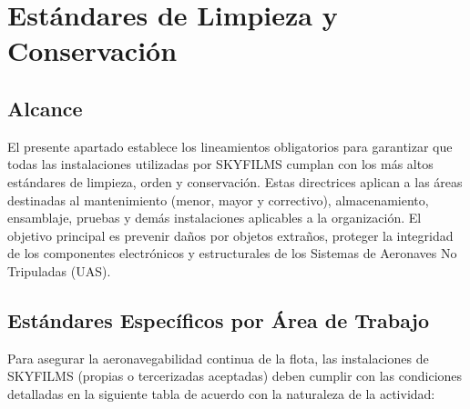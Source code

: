 \section{Estándares de Limpieza y Conservación}

\subsection{Alcance}
El presente apartado establece los lineamientos obligatorios para garantizar que todas las instalaciones utilizadas por SKYFILMS cumplan con los más altos estándares de limpieza, orden y conservación. Estas directrices aplican a las áreas destinadas al mantenimiento (menor, mayor y correctivo), almacenamiento, ensamblaje, pruebas y demás instalaciones aplicables a la organización. El objetivo principal es prevenir daños por objetos extraños, proteger la integridad de los componentes electrónicos y estructurales de los Sistemas de Aeronaves No Tripuladas (UAS).

\subsection{Estándares Específicos por Área de Trabajo}
Para asegurar la aeronavegabilidad continua de la flota, las instalaciones de SKYFILMS (propias o tercerizadas aceptadas) deben cumplir con las condiciones detalladas en la siguiente tabla de acuerdo con la naturaleza de la actividad:

